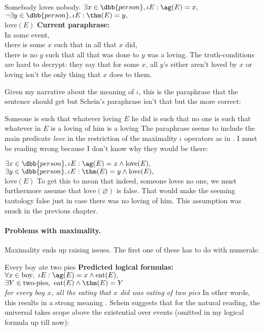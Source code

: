 \pex
\a 
Somebody loves nobody.
\a 
$\exists x\in\dbb{person},\iota E : \ag(E) = x,$\\
$\neg\exists y\in \dbb{person}, \iota E : \thm(E) = y,$\\
$\text{love}(E) $
\a \textbf{Current paraphrase:}\\
In some event,\\
there is some $x$ such that in all that $x$ did,\\
there is no $y$ such that all that was done to $y$ was a loving.
\xe
%
The truth-conditions are hard to decrypt: they say that for some $x$, all $y$'s either aren't loved by $x$ or loving isn't the only thing that $x$ does to them. 

Given my narrative about the meaning of $\iota$, this is the paraphrase that the sentence should get but Schein's paraphrase isn't that but the more correct:

\ex
Someone is such that whatever loving $E$ he did is such that 
no one is such that whatever in $E$ is a loving of him is a loving
\xe
%
The paraphrase seems to include the main predicate \emph{love} in the restriction of the maximality $\iota$ operators as in \cnextx. I must be reading wrong because I don't know why they would be there:

\ex
$\exists x\in\dbb{person},\iota E : \ag(E) = x \wedge \text{love}(E),$\\
\ljudge{$\neg$}$\exists y\in \dbb{person}, \iota E : \thm(E) = y \wedge \text{love}(E),$\\
$\text{love}(E) $
\xe
%
To get this to mean that indeed, someone loves no one, we must furthermore assume that $\text{love}(\varnothing)$ is false. That would make the seeming tautology  false just in case there was no loving of him. This assumption was snuck in the previous chapter.

\paragraph{Problems with maximality.}
Maximality ends up raising issues. The first one of these has to do with numerals:

\pex
\a Every boy ate two pies
\a 
\textbf{Predicted logical formulas:}\\
$
\forall x\in \text{boy},\ \iota E: \ag(E) = x \wedge \text{eat}(E),$\\
$\exists Y\in \text{two-pies},\ \text{eat}(E) \wedge \thm(E) = Y$\\
\emph{
for every boy $x$,
all the eating that $x$ did was eating of two pies
}
\xe
%
In other words, this results in a strong meaning . Schein suggests that for the natural reading, the universal takes scope above the existential over events (omitted in my logical formula up till now):

